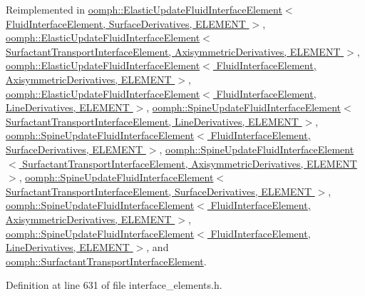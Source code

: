Reimplemented in \hyperlink{classoomph_1_1ElasticUpdateFluidInterfaceElement_a8baae14bdede6a659e948942d7a08cb5}{oomph\+::\+Elastic\+Update\+Fluid\+Interface\+Element$<$ Fluid\+Interface\+Element, Surface\+Derivatives, E\+L\+E\+M\+E\+N\+T $>$}, \hyperlink{classoomph_1_1ElasticUpdateFluidInterfaceElement_a8baae14bdede6a659e948942d7a08cb5}{oomph\+::\+Elastic\+Update\+Fluid\+Interface\+Element$<$ Surfactant\+Transport\+Interface\+Element, Axisymmetric\+Derivatives, E\+L\+E\+M\+E\+N\+T $>$}, \hyperlink{classoomph_1_1ElasticUpdateFluidInterfaceElement_a8baae14bdede6a659e948942d7a08cb5}{oomph\+::\+Elastic\+Update\+Fluid\+Interface\+Element$<$ Fluid\+Interface\+Element, Axisymmetric\+Derivatives, E\+L\+E\+M\+E\+N\+T $>$}, \hyperlink{classoomph_1_1ElasticUpdateFluidInterfaceElement_a8baae14bdede6a659e948942d7a08cb5}{oomph\+::\+Elastic\+Update\+Fluid\+Interface\+Element$<$ Fluid\+Interface\+Element, Line\+Derivatives, E\+L\+E\+M\+E\+N\+T $>$}, \hyperlink{classoomph_1_1SpineUpdateFluidInterfaceElement_a963fdd8b603e563da9fb966e0c429457}{oomph\+::\+Spine\+Update\+Fluid\+Interface\+Element$<$ Surfactant\+Transport\+Interface\+Element, Line\+Derivatives, E\+L\+E\+M\+E\+N\+T $>$}, \hyperlink{classoomph_1_1SpineUpdateFluidInterfaceElement_a963fdd8b603e563da9fb966e0c429457}{oomph\+::\+Spine\+Update\+Fluid\+Interface\+Element$<$ Fluid\+Interface\+Element, Surface\+Derivatives, E\+L\+E\+M\+E\+N\+T $>$}, \hyperlink{classoomph_1_1SpineUpdateFluidInterfaceElement_a963fdd8b603e563da9fb966e0c429457}{oomph\+::\+Spine\+Update\+Fluid\+Interface\+Element$<$ Surfactant\+Transport\+Interface\+Element, Axisymmetric\+Derivatives, E\+L\+E\+M\+E\+N\+T $>$}, \hyperlink{classoomph_1_1SpineUpdateFluidInterfaceElement_a963fdd8b603e563da9fb966e0c429457}{oomph\+::\+Spine\+Update\+Fluid\+Interface\+Element$<$ Surfactant\+Transport\+Interface\+Element, Surface\+Derivatives, E\+L\+E\+M\+E\+N\+T $>$}, \hyperlink{classoomph_1_1SpineUpdateFluidInterfaceElement_a963fdd8b603e563da9fb966e0c429457}{oomph\+::\+Spine\+Update\+Fluid\+Interface\+Element$<$ Fluid\+Interface\+Element, Axisymmetric\+Derivatives, E\+L\+E\+M\+E\+N\+T $>$}, \hyperlink{classoomph_1_1SpineUpdateFluidInterfaceElement_a963fdd8b603e563da9fb966e0c429457}{oomph\+::\+Spine\+Update\+Fluid\+Interface\+Element$<$ Fluid\+Interface\+Element, Line\+Derivatives, E\+L\+E\+M\+E\+N\+T $>$}, and \hyperlink{classoomph_1_1SurfactantTransportInterfaceElement_a32ae151a017b122dd7a4c03511afbcc9}{oomph\+::\+Surfactant\+Transport\+Interface\+Element}.



Definition at line 631 of file interface\+\_\+elements.\+h.



